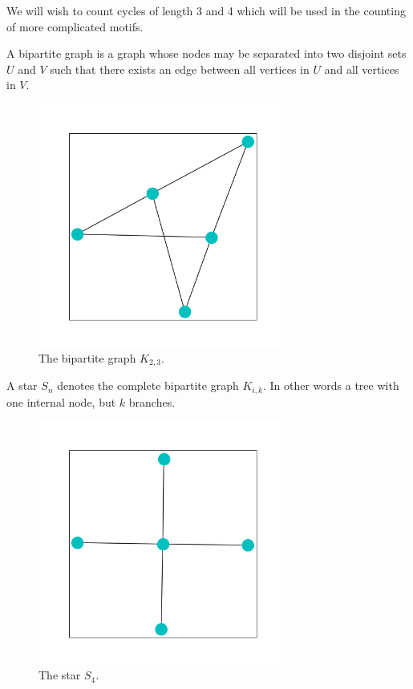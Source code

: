 \noindent We will wish to count cycles of length 3 and 4 which will be used in the counting of more complicated motifs.

\begin{dfn}
    A bipartite graph is a graph whose nodes may be separated into two disjoint sets $U$ and $V$
    such that there exists an edge between all vertices in $U$ and all vertices in $V$.
\end{dfn}

\begin{figure}[h!]
    \includegraphics[width=8cm]{Images/Bipartite.png}
    \centering
    \caption{The bipartite graph $K_{2,3}$.}
\end{figure}

\FloatBarrier

\begin{dfn}
    A star $S_n$ denotes the complete bipartite graph $K_{i,k}$. In other words 
    a tree with one internal node, but $k$ branches.
\end{dfn}

\begin{figure}[h!]
    \includegraphics[width=8cm]{Images/Star.png}
    \centering
    \caption{The star $S_4$.}
\end{figure}


